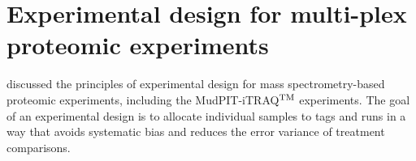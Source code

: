 %
%
% 

\section{Experimental design for multi-plex proteomic experiments}
\label{sec:oberg}
\cite{Oberg2009} discussed the principles of experimental design for mass spectrometry-based proteomic experiments, including the MudPIT-iTRAQ$^{\rm TM}$ experiments. The goal of an experimental design is to allocate individual samples to tags and runs in a way that avoids systematic bias and reduces the error variance of treatment comparisons. 

